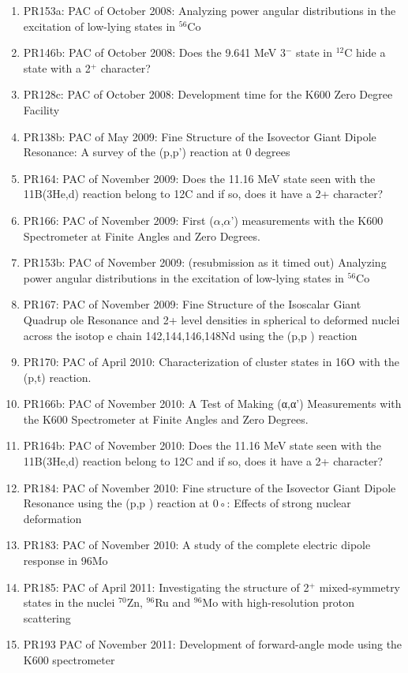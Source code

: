 \documentclass[11pt]{report}
\begin{document}
\begin{enumerate}
\item PR153a: PAC of October 2008:     Analyzing power angular distributions in the excitation of low-lying states in $^{56}$Co 
\item PR146b: PAC of October 2008:      Does the 9.641 MeV 3$^-$ state in $^{12}$C hide a state with a 2$^+$ character? 
\item PR128c: PAC of October 2008:      Development time for the K600 Zero Degree Facility 
\item PR138b: PAC of May 2009:     Fine Structure of the Isovector Giant Dipole Resonance: A survey of the (p,p') reaction at 0 degrees 
\item PR164: PAC of November 2009:     Does the 11.16 MeV state seen with the 11B(3He,d) reaction belong to 12C and if so, does it have a 2+ character? 
\item PR166: PAC of November 2009:     First ($\alpha$,$\alpha$’) measurements with the K600 Spectrometer at Finite Angles and Zero Degrees. 
\item PR153b: PAC of November 2009: (resubmission as it timed out) Analyzing power angular distributions in the excitation of low-lying states in $^{56}$Co 
\item PR167: PAC of November 2009:     Fine Structure of the Isoscalar Giant Quadrup ole Resonance and 2+ level densities in spherical to deformed nuclei across the isotop e chain 142,144,146,148Nd using the (p,p ) reaction 
\item PR170: PAC of April 2010:     Characterization of cluster states in 16O with the (p,t) reaction. 
\item PR166b: PAC of November 2010:     A Test of Making (α,α’) Measurements with the K600 Spectrometer at Finite Angles and Zero Degrees. 
\item PR164b: PAC of November 2010:     Does the 11.16 MeV state seen with the 11B(3He,d) reaction belong to 12C and if so, does it have a 2+ character? 
\item PR184: PAC of November 2010:     Fine structure of the Isovector Giant Dipole Resonance using the (p,p ) reaction at 0◦: Eﬀects of strong nuclear deformation 
\item PR183: PAC of November 2010:     A study of the complete electric dipole response in 96Mo 
\item PR185: PAC of April 2011:   Investigating the structure of 2$^+$ mixed-symmetry states in the nuclei $^{70}$Zn,    
	     $^{96}$Ru and $^{96}$Mo with high-resolution proton scattering
\item PR193  PAC of November 2011: Development of forward-angle mode using the K600 spectrometer

\end{enumerate}
\end{document}
